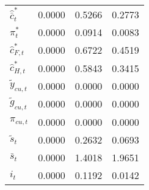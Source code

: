 \begin{center}
\begin{longtable}{lccc}
${\hat {\bar c}_t^*}  $	 & 	       0.0000	 & 	       0.5266	 & 	       0.2773 \\ 
${\pi_t^*}            $	 & 	       0.0000	 & 	       0.0914	 & 	       0.0083 \\ 
${\hat c_{F,t}^*}     $	 & 	       0.0000	 & 	       0.6722	 & 	       0.4519 \\ 
${\hat c_{H,t}^*}     $	 & 	       0.0000	 & 	       0.5843	 & 	       0.3415 \\ 
${\tilde y_{cu,t}}    $	 & 	       0.0000	 & 	       0.0000	 & 	       0.0000 \\ 
${\tilde g_{cu,t}}    $	 & 	       0.0000	 & 	       0.0000	 & 	       0.0000 \\ 
${\pi_{cu,t}}         $	 & 	       0.0000	 & 	       0.0000	 & 	       0.0000 \\ 
${\tilde s_t}         $	 & 	       0.0000	 & 	       0.2632	 & 	       0.0693 \\ 
${\bar s_t}           $	 & 	       0.0000	 & 	       1.4018	 & 	       1.9651 \\ 
${i_t}                $	 & 	       0.0000	 & 	       0.1192	 & 	       0.0142 \\ 
\end{longtable}
 \end{center}
